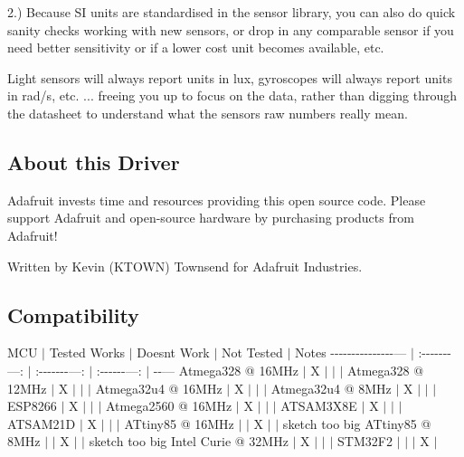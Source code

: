2.) Because SI units are standardised in the sensor library, you can also do quick sanity checks working with new sensors, or drop in any comparable sensor if you need better sensitivity or if a lower cost unit becomes available, etc.

Light sensors will always report units in lux, gyroscopes will always report units in rad/s, etc. ... freeing you up to focus on the data, rather than digging through the datasheet to understand what the sensor\textquotesingle{}s raw numbers really mean.

\subsection*{About this Driver}

Adafruit invests time and resources providing this open source code. Please support Adafruit and open-\/source hardware by purchasing products from Adafruit!

Written by Kevin (K\+T\+O\+WN) Townsend for Adafruit Industries.

\subsection*{Compatibility}

M\+CU $\vert$ Tested Works $\vert$ Doesn\textquotesingle{}t Work $\vert$ Not Tested $\vert$ Notes -\/-\/-\/-\/-\/-\/-\/-\/-\/-\/-\/-\/-\/-\/-\/--- $\vert$ \+:-\/-\/-\/-\/-\/-\/-\/---\+: $\vert$ \+:-\/-\/-\/-\/-\/-\/-\/---\+: $\vert$ \+:-\/-\/-\/-\/-\/-\/---\+: $\vert$ -\/-\/--- Atmega328 @ 16\+M\+Hz $\vert$ X $\vert$ $\vert$ $\vert$ Atmega328 @ 12\+M\+Hz $\vert$ X $\vert$ $\vert$ $\vert$ Atmega32u4 @ 16\+M\+Hz $\vert$ X $\vert$ $\vert$ $\vert$ Atmega32u4 @ 8\+M\+Hz $\vert$ X $\vert$ $\vert$ $\vert$ E\+S\+P8266 $\vert$ X $\vert$ $\vert$ $\vert$ Atmega2560 @ 16\+M\+Hz $\vert$ X $\vert$ $\vert$ $\vert$ A\+T\+S\+A\+M3\+X8E $\vert$ X $\vert$ $\vert$ $\vert$ A\+T\+S\+A\+M21D $\vert$ X $\vert$ $\vert$ $\vert$ A\+Ttiny85 @ 16\+M\+Hz $\vert$ $\vert$ X $\vert$ $\vert$ sketch too big A\+Ttiny85 @ 8\+M\+Hz $\vert$ $\vert$ X $\vert$ $\vert$ sketch too big Intel Curie @ 32\+M\+Hz $\vert$ X $\vert$ $\vert$ $\vert$ S\+T\+M32\+F2 $\vert$ $\vert$ $\vert$ X $\vert$


